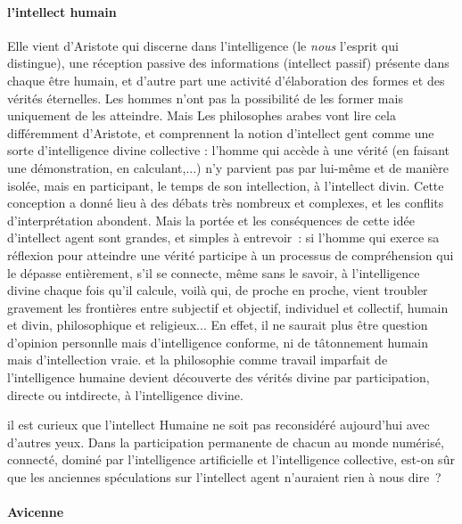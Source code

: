 \paragraph{l'intellect humain}
Elle vient d'Aristote qui discerne dans l'intelligence (le \textit{nous} l'esprit qui distingue), une réception passive des informations (intellect passif) présente dans chaque être humain, et d'autre part une activité d'élaboration des formes et des vérités éternelles. Les hommes n'ont pas la possibilité de les former mais uniquement de les atteindre. Mais Les philosophes arabes vont lire cela différemment d'Aristote, et comprennent la notion d'intellect gent comme une sorte d'intelligence divine collective : l'homme qui accède à une vérité (en faisant une démonstration, en calculant,...) n'y parvient pas par lui-même et de manière isolée, mais en participant, le temps de son intellection, à l'intellect divin. Cette conception a donné lieu à des débats très nombreux et complexes, et les conflits d’interprétation abondent. Mais la portée et les conséquences de cette idée d’intellect agent sont grandes, et simples à entrevoir : si l’homme qui exerce sa réflexion pour atteindre une vérité participe à un processus de compréhension qui le dépasse entièrement, s’il se connecte, même sans le savoir, à l’intelligence divine chaque fois qu’il calcule, voilà qui, de proche en proche, vient troubler gravement les frontières entre subjectif et objectif, individuel et collectif, humain et divin, philosophique et religieux... En effet, il ne saurait plus être question d'opinion personnlle mais d'intelligence conforme, ni de tâtonnement humain mais d'intellection vraie. et la philosophie comme travail imparfait de l'intelligence humaine devient découverte des vérités divine par participation, directe ou intdirecte, à l'intelligence divine. 
 
\begin{Synthesis}
  il est curieux que l'intellect Humaine ne soit pas reconsidéré aujourd’hui avec d’autres yeux. Dans la participation permanente de chacun au monde numérisé, connecté, dominé par l’intelligence artificielle et l’intelligence collective, est-on sûr que les anciennes spéculations sur l’intellect agent n’auraient rien à nous dire ? 
 
\end{Synthesis}

 
\paragraph{Avicenne}




